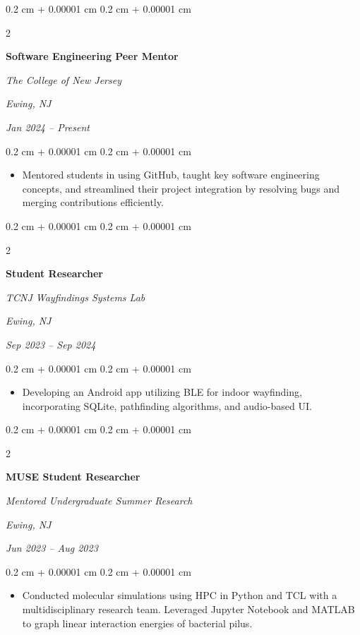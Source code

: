 \documentclass[10pt, letterpaper]{article}
\newenvironment{highlights}{
    \begin{itemize}[
        topsep=0.10 cm,
        parsep=0.10 cm,
        partopsep=0pt,
        itemsep=0pt,
        leftmargin=0.4 cm + 10pt
    ]
}{
    \end{itemize}
} %
\newenvironment{onecolentry}{
    \begin{adjustwidth}{
        0.2 cm + 0.00001 cm
    }{
        0.2 cm + 0.00001 cm
    }
}{
    \end{adjustwidth}
} %
\newenvironment{twocolentry}[2][]{
    \onecolentry
    \def\secondColumn{#2}
    \setcolumnwidth{\fill, 4.5 cm}
    \begin{paracol}{2}
}{
    \switchcolumn \raggedleft \secondColumn
    \end{paracol}
    \endonecolentry
} %
\begin{document}
        
                \begin{twocolentry}{
        \textit{Ewing, NJ}    
            
        \textit{Jan 2024 – Present}}
            \textbf{Software Engineering Peer Mentor }
            
            \textit{The College of New Jersey}
        \end{twocolentry}

        \vspace{0.10 cm}
        \begin{onecolentry}
            \begin{highlights}
                \item Mentored students in using GitHub, taught key software
engineering concepts, and streamlined their project integration by resolving bugs and merging contributions efficiently.
            \end{highlights}
        \end{onecolentry}
        
                    \begin{twocolentry}{
        \textit{Ewing, NJ}    
            
        \textit{Sep 2023 – Sep 2024}}
            \textbf{Student Researcher }
            
            \textit{TCNJ Wayfindings Systems Lab}
       \end{twocolentry}

        \vspace{0.10 cm}
        \begin{onecolentry}
            \begin{highlights}
                \item Developing an Android app utilizing BLE for indoor
wayfinding, incorporating SQLite, pathfinding algorithms, and
audio-based UI.
            \end{highlights}
        \end{onecolentry}


               \begin{twocolentry}{
        \textit{Ewing, NJ}    
            
        \textit{Jun 2023 – Aug 2023}}
            \textbf{MUSE Student Researcher }
            
            \textit{Mentored Undergraduate Summer Research}
       \end{twocolentry}

        \vspace{0.10 cm}
        \begin{onecolentry}
            \begin{highlights}
                \item Conducted molecular simulations using HPC in Python and TCL
with a multidisciplinary research team. Leveraged Jupyter Notebook and MATLAB to graph linear interaction energies of bacterial pilus.
            \end{highlights}
        \end{onecolentry}
\end{document}

